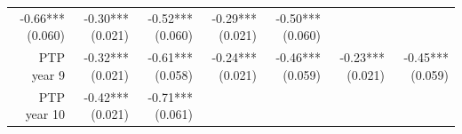 \documentclass[]{article}
\begin{document}
\begin{longtable}[c]{@{}rrrrrrr@{}}
\begin{minipage}[t]{0.12\columnwidth}
-0.66*** (0.060)
\strut\end{minipage} &
\begin{minipage}[t]{0.11\columnwidth}\raggedleft\strut
-0.30*** (0.021)
\strut\end{minipage} &
\begin{minipage}[t]{0.12\columnwidth}\raggedleft\strut
-0.52*** (0.060)
\strut\end{minipage} &
\begin{minipage}[t]{0.11\columnwidth}\raggedleft\strut
-0.29*** (0.021)
\strut\end{minipage} &
\begin{minipage}[t]{0.11\columnwidth}\raggedleft\strut
-0.50*** (0.060)
\strut\end{minipage}\tabularnewline
\begin{minipage}[t]{0.12\columnwidth}\raggedleft\strut
PTP year 9
\strut\end{minipage} &
\begin{minipage}[t]{0.11\columnwidth}\raggedleft\strut
-0.32*** (0.021)
\strut\end{minipage} &
\begin{minipage}[t]{0.12\columnwidth}\raggedleft\strut
-0.61*** (0.058)
\strut\end{minipage} &
\begin{minipage}[t]{0.11\columnwidth}\raggedleft\strut
-0.24*** (0.021)
\strut\end{minipage} &
\begin{minipage}[t]{0.12\columnwidth}\raggedleft\strut
-0.46*** (0.059)
\strut\end{minipage} &
\begin{minipage}[t]{0.11\columnwidth}\raggedleft\strut
-0.23*** (0.021)
\strut\end{minipage} &
\begin{minipage}[t]{0.11\columnwidth}\raggedleft\strut
-0.45*** (0.059)
\strut\end{minipage}\tabularnewline
\begin{minipage}[t]{0.12\columnwidth}\raggedleft\strut
PTP year 10
\strut\end{minipage} &
\begin{minipage}[t]{0.11\columnwidth}\raggedleft\strut
-0.42*** (0.021)
\strut\end{minipage} &
\begin{minipage}[t]{0.12\columnwidth}\raggedleft\strut
-0.71*** (0.061)
\strut\end{minipage} &
\begin{minipage}[t]{0.11\columnwidth}\raggedleft\strut

\end{minipage}
\end{longtable}
\end{document}
